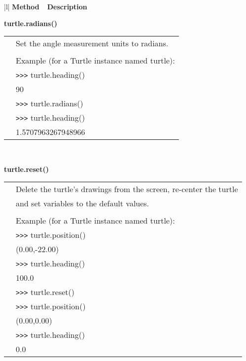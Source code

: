 \begin{center}
{\small
\begin{tabular}{|l|} \hline
{\bf Method~~Description}  \\ \hline\hline 

{\bf    turtle.radians()} \\
   \begin{tabular}{p{0.25in}p{4in}}
&        Set the angle measurement units to radians. \\
&  \\
&        Example (for a Turtle instance named turtle): \\
&        \verb+>+\verb+>+\verb+>+ turtle.heading() \\
&        90 \\
&        \verb+>+\verb+>+\verb+>+ turtle.radians() \\
&        \verb+>+\verb+>+\verb+>+ turtle.heading() \\
&        1.5707963267948966 \\
\end{tabular} \\ \hline


{\bf    turtle.reset()} \\
   \begin{tabular}{p{0.25in}p{4in}}
&                Delete the turtle's drawings from the screen, re-center the turtle \\
&                and set variables to the default values. \\
&  \\
&                Example (for a Turtle instance named turtle): \\
&                \verb+>+\verb+>+\verb+>+ turtle.position() \\
&                (0.00,-22.00) \\
&                \verb+>+\verb+>+\verb+>+ turtle.heading() \\
&                100.0 \\
&                \verb+>+\verb+>+\verb+>+ turtle.reset() \\
&                \verb+>+\verb+>+\verb+>+ turtle.position() \\
&                (0.00,0.00) \\
&                \verb+>+\verb+>+\verb+>+ turtle.heading() \\
&                0.0 \\
\end{tabular} \\ \hline


\end{tabular}}
\end{center}
